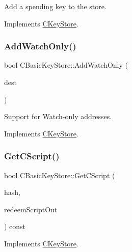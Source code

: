 Add a spending key to the store. 



Implements \mbox{\hyperlink{class_c_key_store_aa78189cb8f342a33570c2ac6d4a0ffcf}{C\+Key\+Store}}.

\mbox{\label{class_c_basic_key_store_a2417d0ae4e654c88cf47a1ba5f71b5a3}} 
\subsubsection{\texorpdfstring{Add\+Watch\+Only()}{AddWatchOnly()}}
{\footnotesize\ttfamily bool C\+Basic\+Key\+Store\+::\+Add\+Watch\+Only (\begin{DoxyParamCaption}\item[{const C\+Script \&}]{dest }\end{DoxyParamCaption})\hspace{0.3cm}{\ttfamily [virtual]}}



Support for Watch-\/only addresses. 



Implements \mbox{\hyperlink{class_c_key_store_a12cd4eaa01bd4f4231c0bf68425a44af}{C\+Key\+Store}}.

\mbox{\label{class_c_basic_key_store_a975abe0f2efa3e0e2270d3714d73010a}} 
\subsubsection{\texorpdfstring{Get\+C\+Script()}{GetCScript()}}
{\footnotesize\ttfamily bool C\+Basic\+Key\+Store\+::\+Get\+C\+Script (\begin{DoxyParamCaption}\item[{const C\+Script\+ID \&}]{hash,  }\item[{C\+Script \&}]{redeem\+Script\+Out }\end{DoxyParamCaption}) const\hspace{0.3cm}{\ttfamily [virtual]}}



Implements \mbox{\hyperlink{class_c_key_store_ae6bf4dbeb0705e199250e48aa5d34264}{C\+Key\+Store}}.

